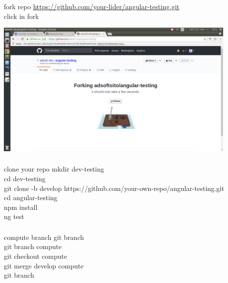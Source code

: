 \documentclass{beamer}
\begin{document}
\begin{frame}\frametitle{} 

\begin{block}{fork repo}
\url{https://github.com/your-lider/angular-testing.git} \\
click in fork
\end{block}

\begin{center}
\includegraphics[width=0.9\textwidth]{forking.png}
\end{center}

\end{frame}

\begin{frame}\frametitle{} 

\begin{block}{clone your repo}
mkdir dev-testing \\
cd dev-testing	 \\
git clone -b develop https://github.com/your-own-repo/angular-testing.git \\
cd angular-testing \\
npm install \\
ng test   
\end{block}

\end{frame}


\begin{frame}\frametitle{} 

\begin{block}{compute branch}
git branch \\
git branch compute \\
git checkout compute \\
git merge develop compute \\
git branch 
\end{block}

\end{frame}
\end{document}
